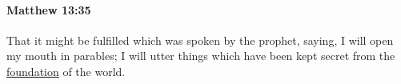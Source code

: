 			\begin{framed}
			\scriptsize
				\begin{compactdesc}
					\item[SBLG] 
				\end{compactdesc}
			\end{framed}

		\paragraph{Matthew 13:35} %
			\label{MATTHEW-13-35}

			That it might be fulfilled which was spoken by the prophet, saying, I will open my mouth in parables; I will utter things which have been kept secret from the \hyperref[FOUNDATION]{foundation} of the world.

			\begin{framed}
			\scriptsize
				\begin{compactdesc}
					\item[SBLG]  \hyperref[KATABOLE]{\grl{καταβολῆς}}\gr{.}
				\end{compactdesc}
			\end{framed}

